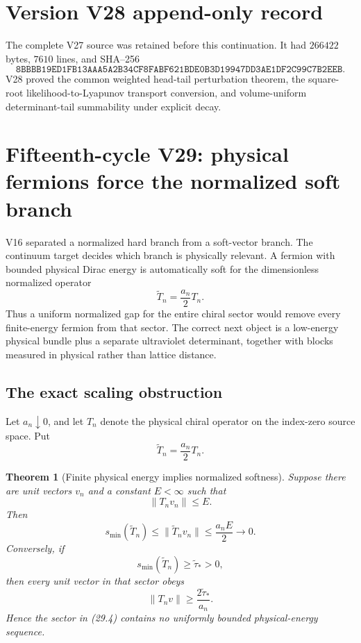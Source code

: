 \documentclass[11pt]{article}
\newtheorem{theorem}{Theorem}[section]
\theoremstyle{remark}
\begin{document}
\section*{Version V28 append-only record}
The complete V27 source was retained before this continuation.  It
had \(266422\) bytes, \(7610\) lines, and SHA--256
\[
 \texttt{8BBBB19ED1FB13AAA5A2B34CF8FABF621BDE0B3D19947DD3AE1DF2C99C7B2EEB}.
\]
V28 proved the common weighted head-tail perturbation theorem,
the square-root likelihood-to-Lyapunov transport conversion, and
volume-uniform determinant-tail summability under explicit decay.
\section{Fifteenth-cycle V29: physical fermions force the normalized soft branch}
\label{sec:v15v29}

V16 separated a normalized hard branch from a soft-vector branch.
The continuum target decides which branch is physically relevant.
A fermion with bounded physical Dirac energy is automatically soft
for the dimensionless normalized operator
\[
 \widetilde T_n=\frac{a_n}{2}T_n.
\]
Thus a uniform normalized gap for the entire chiral sector would
remove every finite-energy fermion from that sector.  The correct
next object is a low-energy physical bundle plus a separate
ultraviolet determinant, together with blocks measured in physical
rather than lattice distance.

\subsection{The exact scaling obstruction}

Let \(a_n\downarrow0\), and let \(T_n\) denote the physical chiral
operator on the index-zero source space.  Put
\[
 \widetilde T_n=\frac{a_n}{2}T_n.                           \tag{29.1}
\]

\begin{theorem}[Finite physical energy implies normalized softness]
\label{thm:v15v29-physical-soft}
Suppose there are unit vectors \(v_n\) and a constant \(E<\infty\)
such that
\[
 \|T_nv_n\|\le E.                                          \tag{29.2}
\]
Then
\[
 \boxed{
 s_{\min}(\widetilde T_n)
 \le\|\widetilde T_nv_n\|
 \le\frac{a_nE}{2}\longrightarrow0.}                       \tag{29.3}
\]
Conversely, if
\[
 s_{\min}(\widetilde T_n)\ge\widetilde\tau_*>0,             \tag{29.4}
\]
then every unit vector in that sector obeys
\[
 \|T_nv\|\ge\frac{2\widetilde\tau_*}{a_n}.                  \tag{29.5}
\]
Hence the sector in (29.4) contains no uniformly bounded
physical-energy sequence.
\end{theorem}
\end{document}
